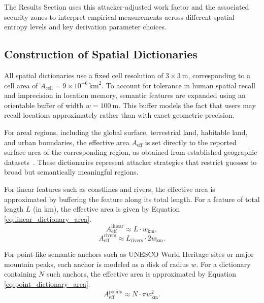 \documentclass[mathematics,article,accept,pdftex,moreauthors]{Definitions/mdpi}
\begin{document}
The Results Section uses this attacker-adjusted work factor and the associated security zones to interpret empirical measurements across different spatial entropy levels and key derivation parameter choices.

\subsection{Construction of Spatial Dictionaries}

All spatial dictionaries use a fixed cell resolution of $3\times3~\text{m}$, corresponding to a cell area of $A_{\text{cell}} = 9 \times 10^{-6}\,\text{km}^2$. To account for tolerance in human spatial recall and imprecision in location memory, semantic features are expanded using an orientable buffer of width $w = 100~\text{m}$. This buffer models the fact that users may recall locations approximately rather than with exact geometric precision.

For areal regions, including the global surface, terrestrial land, habitable land, and urban boundaries, the effective area $A_{\text{eff}}$ is set directly to the reported surface area of the corresponding region, as obtained from established geographic datasets~\cite{FAO_GLC,Venter2016}. These dictionaries represent attacker strategies that restrict guesses to broad but semantically meaningful regions.

For linear features such as coastlines and rivers, the effective area is approximated by buffering the feature along its total length. For a feature of total length $L$ (in km), the effective area is given by Equation \eqref{eq:linear_dictionary_area}.
\begin{equation}
A_{\text{eff}}^{\text{linear}} \approx L \cdot w_{\text{km}},
\label{eq:linear_dictionary_area}
\end{equation}
\begin{equation}
A_{\text{eff}}^{\text{rivers}} \approx L_{\text{rivers}} \cdot 2 w_{\text{km}}.
\label{eq:river_dictionary_area}
\end{equation}

For point-like semantic anchors such as UNESCO World Heritage sites or major mountain peaks, each anchor is modeled as a disk of radius $w$. For a dictionary containing $N$ such anchors, the effective area is approximated by Equation \eqref{eq:point_dictionary_area}.
\begin{equation}
A_{\text{eff}}^{\text{points}} \approx N \cdot \pi w_{\text{km}}^2.
\label{eq:point_dictionary_area}
\end{equation}
\end{document}
